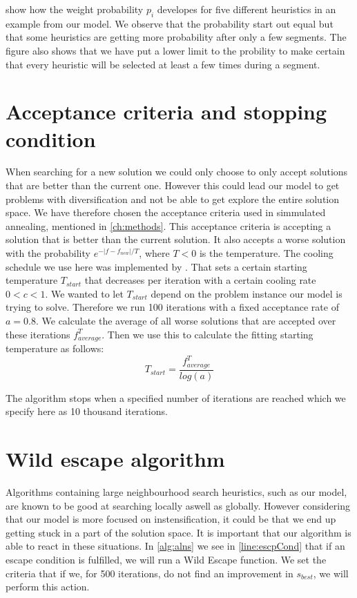 \documentclass[../main.tex]{subfiles}
\begin{document}
 show how the weight probability $p_i$ developes for five different heuristics in an example from our model. 
We observe that the probability start out equal but that some heuristics are getting more probability after only a few segments.
The figure also shows that we have put a lower limit to the probility to make certain that every heuristic will be selected at least a few times during a segment.

\section{Acceptance criteria and stopping condition}
\label{sec:accept}
When searching for a new solution we could only choose to only accept solutions that are better than the current one.
However this could lead our model to get problems with diversification and not be able to get explore the entire solution space. 
We have therefore chosen the acceptance criteria used in simmulated annealing, mentioned in \cref{ch:methods}. 
This acceptance criteria is accepting a solution that is better than the current solution. It also accepts a worse solution with the probability $e^{-|f-f_{new}|/T}$, where $T<0$ is the temperature. 
The cooling schedule we use here was implemented by \cite{crama03}. That sets a certain starting temperature $T_{start}$ that decreases per iteration with a certain cooling rate $0<c<1$.
We wanted to let $T_{start}$ depend on the problem instance our model is trying to solve. Therefore we run 100 iterations with a fixed acceptance rate of $a = 0.8$. 
We calculate the average of all worse solutions that are accepted over these iterations $f^T_{average}$.  
Then we use this to calculate the fitting starting temperature as follows:
\begin{equation}\label{eq:startTemp}
    T_{start} = \dfrac{f^T_{average}}{log(a)}
\end{equation}

The algorithm stops when a specified number of iterations are reached which we specify here as 10 thousand iterations.

\section{Wild escape algorithm}
\label{sec:wild}
Algorithms containing large neighbourhood search heuristics, such as our model, are known to be good at searching locally aswell as globally. 
However considering that our model is more focused on instensification, it could be that we end up getting stuck in a part of the solution space. It is important that our algorithm is able to react in these situations.
In \cref{alg:alns} we see in \cref{line:escpCond} that if an escape condition is fulfilled, we will run a Wild Escape function. 
We set the criteria that if we, for 500 iterations, do not find an improvement in $s_{best}$, we will perform this action.
\end{document}
